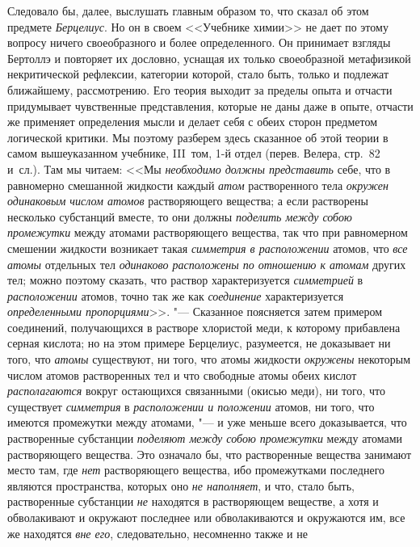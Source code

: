 Следовало бы, далее, выслушать главным образом то, что сказал об этом
предмете {\em Берцелиус}. Но он в своем <<Учебнике
химии>>
не дает по этому вопросу ничего своеобразного и более определенного. Он
принимает взгляды Бертоллэ и повторяет их дословно, уснащая их только
своеобразной метафизикой некритической рефлексии, категории которой, стало
быть, только и подлежат ближайшему, рассмотрению. Его теория выходит за
пределы опыта и отчасти придумывает чувственные представления, которые не
даны даже в опыте, отчасти же применяет определения мысли и делает себя с
обеих сторон предметом логической критики. Мы поэтому разберем здесь
сказанное об этой теории в самом вышеуказанном учебнике, III~том, 1-й отдел
(перев. Велера, стр.~82 и~сл.). Там мы читаем: <<Мы
{\em необходимо должны представить} себе, что в
равномерно смешанной жидкости каждый {\em атом}
растворенного тела {\em окружен одинаковым числом
атомов} растворяющего вещества; а если растворены несколько субстанций
вместе, то они должны {\em поделить между собою
промежутки} между атомами растворяющего вещества, так что при равномерном
смешении жидкости возникает такая {\em симметрия в
расположении} атомов, что {\em все атомы} отдельных тел
{\em одинаково расположены по отношению к атомам}
других тел; можно поэтому сказать, что раствор характеризуется
{\em симметрией} в
{\em расположении} атомов, точно так же как
{\em соединение} характеризуется
{\em определенными пропорциями}>>. "--- Сказанное
поясняется затем примером соединений, получающихся в растворе хлористой
меди, к которому прибавлена серная кислота; но на этом примере Берцелиус,
разумеется, не доказывает ни того, что {\em атомы}
существуют, ни того, что атомы жидкости {\em окружены}
некоторым числом атомов растворенных тел и что свободные атомы обеих кислот
{\em располагаются} вокруг остающихся связанными
(окисью меди), ни того, что существует {\em симметрия}
в {\em расположении и положении} атомов, ни того, что
имеются промежутки между атомами, "--- и уже меньше всего доказывается, что
растворенные субстанции {\em поделяют между собою
промежутки} между атомами растворяющего вещества. Это означало бы, что
растворенные вещества занимают место там, где {\em нет}
растворяющего вещества, ибо промежутками последнего являются пространства,
которых оно {\em не наполняет}, и что, стало быть,
растворенные субстанции {\em не} находятся в
растворяющем веществе, а хотя и обволакивают и окружают последнее или
обволакиваются и окружаются им, все же находятся
{\em вне его}, следовательно, несомненно также и не
